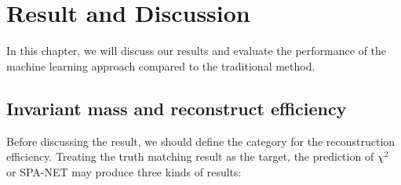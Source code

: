 \chapter{Result and Discussion} \label{Discussion}

In this chapter, we will discuss our results and evaluate the performance of the machine learning approach compared to the traditional method.

\section{Invariant mass and reconstruct efficiency }\label{sec:inv mass and reco eff}

Before discussing the result, we should define the category for the reconstruction efficiency. Treating the truth matching result as the target, the prediction of $\chi^{2}$ or SPA-NET may produce three kinds of results:


